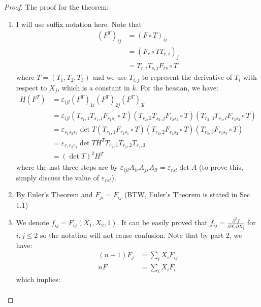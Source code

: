 \documentclass{solution}
\begin{document}
\begin{proof}
    The proof for the theorem:

    \begin{enumerate}
        \item I will use suffix notation here. Note that
        $$
            \begin{aligned}
            (F^T)_{ij} &= (F \circ T)_{ij} \\
            &= \left(F_{r} \circ T T_{r, i}\right)_j \\
            &= T_{r, i} T_{s, j} F_{rs} \circ T
            \end{aligned}
        $$
        where $T = (T_1, T_2, T_3)$ and we use $T_{i, j}$ to represent the derivative of $T_i$ with respect to $X_j$, which is a constant in $k$. For the hessian, we have:
        $$
            \begin{aligned}
            H(F^T) &= \varepsilon_{ijl}(F^T)_{1i}(F^T)_{2j}(F^T)_{3l} \\
            &= \varepsilon_{ijl} (T_{r_1, 1} T_{s_1, i} F_{r_1s_1} \circ T) (T_{r_2, 2} T_{s_2, j} F_{r_2s_2} \circ T) (T_{r_3, 3} T_{s_3, l} F_{r_3s_3} \circ T) \\
            &= \varepsilon_{s_1s_2s_3} \det T (T_{r_1, 1} F_{r_1s_1} \circ T) (T_{r_2, 2} F_{r_2s_2} \circ T) (T_{r_3, 3} F_{r_3s_3} \circ T) \\
            &= \varepsilon_{r_1r_2r_3} \det T H^T T_{r_1, 1} T_{r_2, 2}  T_{r_3, 3} \\
            &= (\det T)^2 H^T
            \end{aligned}
        $$
        where the last three steps are by $\varepsilon_{ijl} A_{ir}A_{js}A_{lt} = \varepsilon_{rst} \det A$ (to prove this, simply discuss the value of $\varepsilon_{rst}$).
        \item By Euler's Theorem and $F_{ji} = F_{ij}$ (BTW, Euler's Theorem is stated in Sec 1.1)
        \item We denote $f_{ij} = F_{ij}(X_1, X_2, 1)$. It can be easily proved that $f_{ij} = \frac{\partial^2 f}{\partial X_i \partial X_j}$ for $i, j \le 2$ so the notation will not cause confusion. Note that by part 2, we have:
        $$
            \begin{aligned}
            (n - 1)F_j &= \sum\limits_{i} X_iF_{ij} \\
            n F &= \sum\limits_{i} X_i F_i
            \end{aligned}
        $$
        which implies:
        $$
            \begin{aligned}

\end{aligned}$$
\end{enumerate}
\end{proof}
\end{document}
